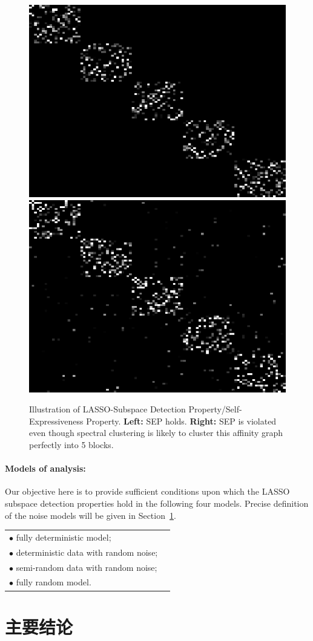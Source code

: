 \documentclass{ctexart}
\begin{document}
\begin{figure}
  \centering
  \includegraphics[width=0.35\linewidth]{pics/SEP.png}
  \includegraphics[width=0.35\linewidth]{pics/ViolateSEP.png}\\
  \caption{Illustration of LASSO-Subspace Detection Property/Self-Expressiveness Property. \textbf{Left:} SEP holds. \textbf{Right:} SEP is violated even though spectral clustering is likely to cluster this affinity graph perfectly into 5 blocks.}\label{fig:SEP}
\end{figure}

\paragraph{Models of analysis: }
Our objective here is to provide sufficient conditions upon which the LASSO subspace detection properties hold in the following four models. Precise definition of the noise models will be given in Section~\ref{sec:main}.

\begin{tabular}{ll}
  $\bullet$ fully deterministic model;\\
  $\bullet$ deterministic data with random noise;\\
  $\bullet$ semi-random data with random noise;\\
  $\bullet$ fully random model.
\end{tabular}




\section{主要结论}\label{sec:main}
\end{document}
